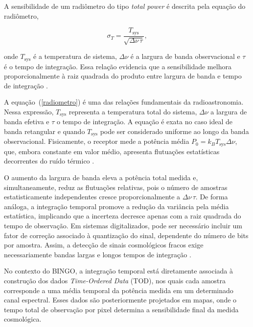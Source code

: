 A sensibilidade de um radiômetro do tipo \textit{total power} é descrita pela equação do radiômetro,

\begin{equation}
\sigma_T = \frac{T_{\mathrm{sys}}}{\sqrt{\Delta \nu \, \tau}},
\label{radiometro}
\end{equation}

onde $T_{\mathrm{sys}}$ é a temperatura de sistema, $\Delta \nu$ é a largura de banda observacional e $\tau$ é o tempo de integração. Essa relação evidencia que a sensibilidade melhora proporcionalmente à raiz quadrada do produto entre largura de banda e tempo de integração \cite{Vieira2020, burke2019introduction}.

A equação~(\ref{radiometro}) é uma das relações fundamentais da radioastronomia. Nessa expressão, $T_{\mathrm{sys}}$ representa a temperatura total do sistema, $\Delta \nu$ a largura de banda efetiva e $\tau$ o tempo de integração. A equação é exata no caso ideal de banda retangular e quando $T_{\mathrm{sys}}$ pode ser considerado uniforme ao longo da banda observacional. Fisicamente, o receptor mede a potência média $P_0 = k_B T_{\mathrm{sys}} \Delta \nu$, que, embora constante em valor médio, apresenta flutuações estatísticas decorrentes do ruído térmico \cite{burke2019introduction}.

O aumento da largura de banda eleva a potência total medida e, simultaneamente, reduz as flutuações relativas, pois o número de amostras estatisticamente independentes cresce proporcionalmente a $\Delta \nu \, \tau$. De forma análoga, a integração temporal promove a redução da variância pela média estatística, implicando que a incerteza decresce apenas com a raiz quadrada do tempo de observação. Em sistemas digitalizados, pode ser necessário incluir um fator de correção associado à quantização do sinal, dependente do número de bits por amostra. Assim, a detecção de sinais cosmológicos fracos exige necessariamente bandas largas e longos tempos de integração \cite{burke2019introduction}.



No contexto do BINGO, a integração temporal está diretamente associada à construção dos dados \textit{Time-Ordered Data} (TOD), nos quais cada amostra corresponde a uma média temporal da potência medida em um determinado canal espectral. Esses dados são posteriormente projetados em mapas, onde o tempo total de observação por pixel determina a sensibilidade final da medida cosmológica.

